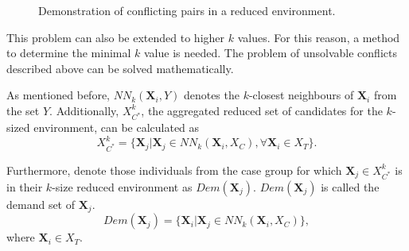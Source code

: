 		\begin{figure}[h]
			\centering
			\captionsetup{justification=centering}
			\caption{Demonstration of conflicting pairs in a reduced environment. %
			}
			\label{fig:conflict_example}
		\end{figure}
										
		This problem can also be extended to higher $k$ values. For this reason, a method to determine the minimal $k$ value is needed. The problem of unsolvable conflicts described above can be solved mathematically.
										
		As mentioned before, $NN_k (\textbf{X}_i,Y)$ denotes the $k$-closest neighbours of $\textbf{X}_i$ from the set $Y$. Additionally, $X_{C^*}^{k}$, the aggregated reduced set of candidates for the $k$-sized environment, can be calculated as 
		\begin{equation}
			X_{C^*}^{k}=\{\textbf{X}_j | \textbf{X}_j \in NN_k (\textbf{X}_i,X_C), \forall \textbf{X}_i \in X_T\}.
			\label{eq:aggregatedreducedset}
		\end{equation}
										
		Furthermore, denote those individuals from the case group for which $\textbf{X}_j \in X_{C^*}^{k}$ is in their $k$-size reduced environment as $Dem(\textbf{X}_j)$. $Dem(\textbf{X}_j)$ is called the demand set of $\textbf{X}_j$.			
		\begin{equation}
			Dem(\textbf{X}_j)=\{\textbf{X}_i | \textbf{X}_j \in  NN_k(\textbf{X}_i,X_C) \},
			\label{eq:demandset}
		\end{equation}
		where $\textbf{X}_i \in X_T $.
										
